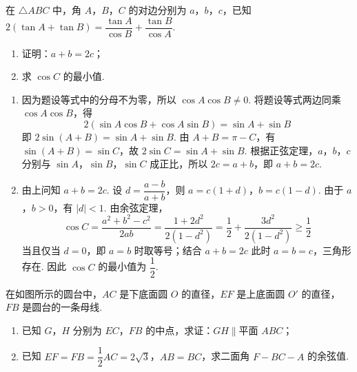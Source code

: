 \begin{problem}
在 \(\triangle ABC\) 中，角 \(A\)，\(B\)，\(C\) 的对边分别为 \(a\)，\(b\)，\(c\)，已知 \(2\left(\tan A+\tan B\right)=\dfrac{\tan A}{\cos B}+\dfrac{\tan B}{\cos A}\).
\begin{enumerate}
\item 证明：\(a+b=2c\)；
\item 求 \(\cos C\) 的最小值.
\end{enumerate}
\end{problem}

\begin{solution}
\begin{enumerate}
\item 因为题设等式中的分母不为零，所以 \(\cos A\cos B\neq0\). 将题设等式两边同乘 \(\cos A\cos B\)，得
\[
2(\sin A\cos B+\cos A\sin B)=\sin A+\sin B
\]
即 \(2\sin(A+B)=\sin A+\sin B\). 由 \(A+B=\pi-C\)，有 \(\sin(A+B)=\sin C\)，故 \(2\sin C=\sin A+\sin B\). 根据正弦定理，\(a\)，\(b\)，\(c\) 分别与 \(\sin A\)，\(\sin B\)，\(\sin C\) 成正比，所以 \(2c=a+b\)，即 \(a+b=2c\).
\item 由上问知 \(a+b=2c\). 设 \(d=\dfrac{a-b}{a+b}\)，则 \(a=c(1+d)\)，\(b=c(1-d)\).
由于 \(a\)，\(b>0\)，有 \(|d|<1\). 由余弦定理，
\[
\cos C=\frac{a^2+b^2-c^2}{2ab}=\frac{1+2d^2}{2(1-d^2)}=\frac12+\frac{3d^2}{2(1-d^2)}\geq\frac12
\]
当且仅当 \(d=0\)，即 \(a=b\) 时取等号；结合 \(a+b=2c\) 此时 \(a=b=c\)，三角形存在. 因此 \(\cos C\) 的最小值为 \(\dfrac12\).
\end{enumerate}
\end{solution}

\begin{problem}
在如图所示的圆台中，\(AC\) 是下底面圆 \(O\) 的直径，\(EF\) 是上底面圆 \(O'\) 的直径，\(FB\) 是圆台的一条母线.
\begin{enumerate}
\item 已知 \(G\)，\(H\) 分别为 \(EC\)，\(FB\) 的中点，求证：\(GH\parallel\text{平面 }ABC\)；
\item 已知 \(EF=FB=\dfrac12AC=2\sqrt3\)，\(AB=BC\)，求二面角 \(F-BC-A\) 的余弦值.
\end{enumerate}

\end{problem}

